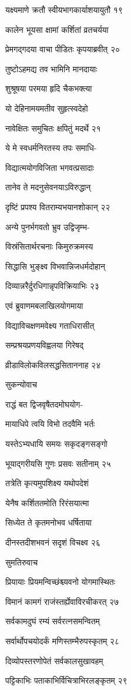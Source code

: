 यक्ष्यमाणे क्रतौ स्वीयभागकार्याशयायुतौ १९

कालेन भूयसा क्षामां कर्शितां व्रतचर्यया

प्रेमगद्गदया वाचा पीडितः कृपयाब्रवीत् २०

तुष्टोऽहमद्य तव भामिनि मानदायाः

शुश्रूषया परमया हृदि चैकभक्त्या

यो देहिनामयमतीव सुहृत्स्वदेहो

नावेक्षितः समुचितः क्षपितुं मदर्थे २१

ये मे स्वधर्मनिरतस्य तपः समाधि-

विद्यात्मयोगविजिता भगवत्प्रसादाः

तानेव ते मदनुसेवनयाऽविरुद्धान्

दृष्टिं प्रपश्य वितराम्यभयानशोकान् २२

अन्ये पुनर्भगवतो भ्रुव उद्विजृम्भ-

विस्रंसितार्थरचनाः किमुरुक्रमस्य

सिद्धासि भुङ्क्ष्व विभवान्निजधर्मदोहान्

दिव्यान्नरैर्दुरधिगान्नृपविक्रियाभिः २३

एवं ब्रुवाणमबलाखिलयोगमाया

विद्याविचक्षणमवेक्ष्य गताधिरासीत्

सम्प्रश्रयप्रणयविह्वलया गिरेषद्

व्रीडाविलोकविलसद्धसिताननाह २४

सुकन्योवाच

राद्धं बत द्विजवृषैतदमोघयोग-

मायाधिपे त्वयि विभो तदवैमि भर्तः

यस्तेऽभ्यधायि समयः सकृदङ्गसङ्गो

भूयाद्गरीयसि गुणः प्रसवः सतीनाम् २५

तत्रेति कृत्यमुपशिक्ष्य यथोपदेशं

येनैष कर्शिततमोति रिरंसयात्मा

सिध्येत ते कृतमनोभव धर्षिताया

दीनस्तदीशभवनं सदृशं विचक्ष्व २६

सुमतिरुवाच

प्रियायाः प्रियमन्विच्छंश्च्यवनो योगमास्थितः

विमानं कामगं राजंस्तर्ह्येवाविरचीकरत् २७

सर्वकामदुघं रम्यं सर्वरत्नसमन्वितम्

सर्वार्थोपचयोदर्कं मणिस्तम्भैरुपस्कृतम् २८

दिव्योपस्तरणोपेतं सर्वकालसुखावहम्

पट्टिकाभिः पताकाभिर्विचित्राभिरलङ्कृतम् २९

